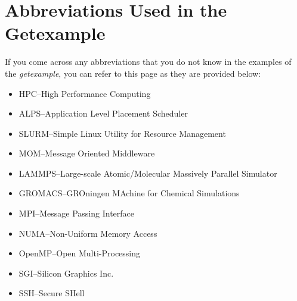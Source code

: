 \section{Abbreviations Used in the Getexample}

If you come across any abbreviations that you do not know in the examples of the \emph{getexample}, you can refer to this page as they are provided 
below: 

\begin{itemize}
\item HPC--High Performance Computing
\item ALPS--Application Level Placement Scheduler
\item SLURM--Simple Linux Utility for Resource Management
\item MOM--Message Oriented Middleware
\item LAMMPS--Large-scale Atomic/Molecular Massively Parallel Simulator
\item GROMACS--GROningen MAchine for Chemical Simulations
\item MPI--Message Passing Interface
\item NUMA--Non-Uniform Memory Access
\item OpenMP--Open Multi-Processing
\item SGI--Silicon Graphics Inc.
\item SSH--Secure SHell
\end{itemize}
